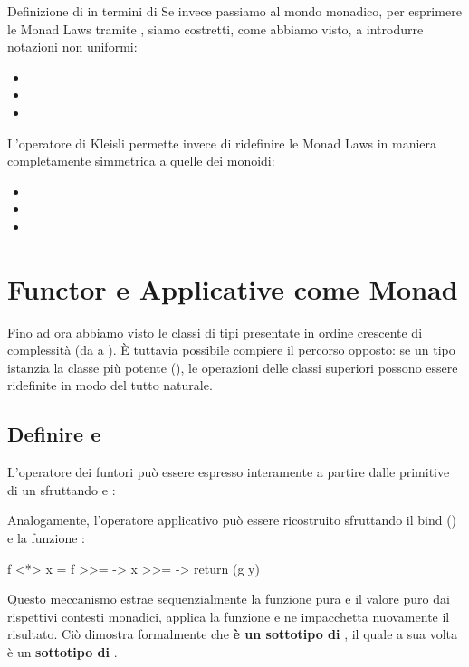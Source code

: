 \begin{gframe}{Definizione di \code{>>=} in termini di \code{>=>}}
Se invece passiamo al mondo monadico, per esprimere le Monad Laws tramite \code{>>=}, siamo costretti, come abbiamo visto, a introdurre notazioni non uniformi:
\begin{itemize}
    \item {}
    \item {}
    \item {}
\end{itemize}

L'operatore di Kleisli permette invece di ridefinire le Monad Laws in maniera completamente simmetrica a quelle dei monoidi:
\begin{itemize}
    \item {}
    \item {}
    \item {}
\end{itemize}
\end{gframe}

\section{Functor e Applicative come Monad}
Fino ad ora abbiamo visto le classi di tipi presentate in ordine crescente di complessità (da  a ). È tuttavia possibile compiere il percorso opposto: se un tipo istanzia la classe più potente (), le operazioni delle classi superiori possono essere ridefinite in modo del tutto naturale.

\subsection{Definire  e \code{<*>}}
L'operatore  dei funtori può essere espresso interamente a partire dalle primitive di un  sfruttando  e \code{<*>}:

Analogamente, l'operatore applicativo \code{<*>} può essere ricostruito sfruttando il bind (\code{>>=}) e la funzione :
\begin{haskellbox}{}
f <*> x = f >>= \g -> x >>= \y -> return (g y)
\end{haskellbox}
Questo meccanismo estrae sequenzialmente la funzione pura  e il valore puro  dai rispettivi contesti monadici, applica la funzione e ne impacchetta nuovamente il risultato. Ciò dimostra formalmente che \textbf{ è un sottotipo di }, il quale a sua volta è un \textbf{sottotipo di }.


